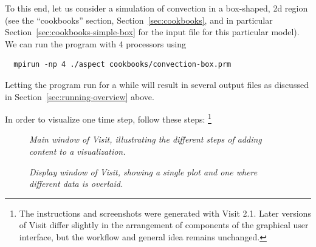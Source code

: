 \documentclass{article}
\begin{document}
To this end, let us consider a simulation of convection in a box-shaped, 2d
region (see the ``cookbooks'' section, Section~\ref{sec:cookbooks}, and in
particular Section~\ref{sec:cookbooks-simple-box} for
the input file for this particular model). We can run the program with 4 processors using
\begin{verbatim}
  mpirun -np 4 ./aspect cookbooks/convection-box.prm
\end{verbatim}
Letting the program run for a while will result in several output files as
discussed in Section~\ref{sec:running-overview} above.

In order to visualize one time step, follow these steps:%
\footnote{The instructions and screenshots were generated with Visit
  2.1. Later versions of Visit differ slightly in the arrangement of
  components of the graphical user interface, but the workflow and general
  idea remains unchanged.}

\begin{figure}[tbp]
  \phantom{.}
  \hfill
  \hfill
  \hfill
  \hfill
  \phantom{.}
  \caption{\it Main window of Visit, illustrating the different steps of
    adding content to a visualization.}
  \label{fig:visit-1}
\end{figure}

\begin{figure}[tbp]
  \phantom{.}
  \hfill
  \hfill
  \hfill
  \phantom{.}
  \caption{\it Display window of Visit, showing a single plot and one where
    different data is overlaid.}
  \label{fig:visit-2}
\end{figure}
\end{document}

